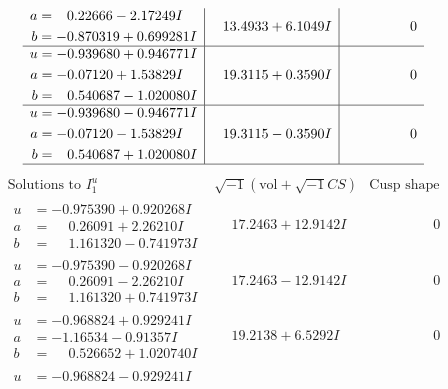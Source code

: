 \documentclass[1p]{elsarticle_modified}
\theoremstyle{definition}
\newcommand{\I}{\sqrt{-1}}
\begin{document}
$$\begin{array}{c|c|c}
\begin{aligned}
a &= \phantom{-}0.22666 - 2.17249 I \\
b &= -0.870319 + 0.699281 I\end{aligned}
 & \phantom{-}13.4933 + 6.1049 I & \phantom{-0.000000 } 0 \\ \hline\begin{aligned}
u &= -0.939680 + 0.946771 I \\
a &= -0.07120 + 1.53829 I \\
b &= \phantom{-}0.540687 - 1.020080 I\end{aligned}
 & \phantom{-}19.3115 + 0.3590 I & \phantom{-0.000000 } 0 \\ \hline\begin{aligned}
u &= -0.939680 - 0.946771 I \\
a &= -0.07120 - 1.53829 I \\
b &= \phantom{-}0.540687 + 1.020080 I\end{aligned}
 & \phantom{-}19.3115 - 0.3590 I & \phantom{-0.000000 } 0\\
 \hline 
 \end{array}$$\newpage$$\begin{array}{c|c|c}  
\text{Solutions to }I^u_{1}& \I (\text{vol} + \sqrt{-1}CS) & \text{Cusp shape}\\
 \hline 
\begin{aligned}
u &= -0.975390 + 0.920268 I \\
a &= \phantom{-}0.26091 + 2.26210 I \\
b &= \phantom{-}1.161320 - 0.741973 I\end{aligned}
 & \phantom{-}17.2463 + 12.9142 I & \phantom{-0.000000 } 0 \\ \hline\begin{aligned}
u &= -0.975390 - 0.920268 I \\
a &= \phantom{-}0.26091 - 2.26210 I \\
b &= \phantom{-}1.161320 + 0.741973 I\end{aligned}
 & \phantom{-}17.2463 - 12.9142 I & \phantom{-0.000000 } 0 \\ \hline\begin{aligned}
u &= -0.968824 + 0.929241 I \\
a &= -1.16534 - 0.91357 I \\
b &= \phantom{-}0.526652 + 1.020740 I\end{aligned}
 & \phantom{-}19.2138 + 6.5292 I & \phantom{-0.000000 } 0 \\ \hline\begin{aligned}
u &= -0.968824 - 0.929241 I \\

\end{aligned}
\end{array}$$
\end{document}
